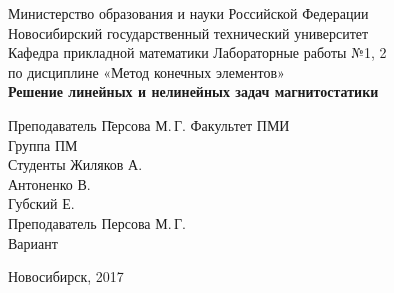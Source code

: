 \begin{titlepage}
    \begin{center}
        Министерство образования и науки Российской Федерации\\
        Новосибирский государственный технический университет\\
        Кафедра прикладной математики
        \vfill
        \Large
        Лабораторные работы №1, 2\\ 
        по дисциплине «Метод конечных элементов»\\
        \Huge
        \textbf{Решение линейных и нелинейных задач магнитостатики}
    \end{center}

    \vfill

    \begin{tabbing}
        Преподаватель \qquad\= Персова М.\,Г. \kill
        Факультет \>		ПМИ \\
        Группа \>			ПМ \\
        Студенты \>			Жиляков А. \\
		         \>			Антоненко В. \\
		         \>			Губский Е. \\
        Преподаватель \>	Персова М.\,Г. \\
        Вариант 
    \end{tabbing}

    \vfill

    \begin{center}
        Новосибирск, 2017
    \end{center}
\end{titlepage} 